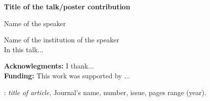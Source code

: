 \documentclass{article}
\begin{document}
\thispagestyle{empty}
\newcommand{\titulo}[1]{{\large\bf #1}}
\newcommand{\nome}[1]{{\large #1}}
\newcommand{\instituicao}[1]{#1}
\newcommand{\resumo}[1]{#1}
\newcommand{\ack}[1]{\textbf{Acknowlegments:} #1}
\newcommand{\funding}[1]{\textbf{Funding:} #1}

\renewcommand{\refname}{\normalsize References}

\noindent
\titulo{Title of the talk/poster contribution}

\bigskip

\noindent
\nome{Name of the speaker}\\
\noindent

\noindent
\instituicao{Name of the institution of the speaker}\\


\noindent
\resumo{\newline 
In this talk...
}\\

\bigskip

\noindent
\ack{I thank... }\\

 
\noindent
\funding{This work was  supported by ... }


\begin{thebibliography}{99}%
\normalsize
{} {}: {\it title of article}, { Journal's name, number, issue, pages range (year).}

\end{thebibliography}
\end{document}
